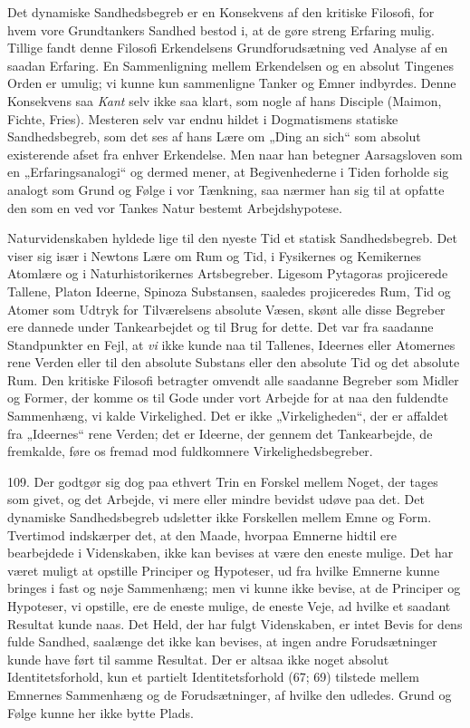 \documentclass[12pt,a4paper]{book}
\newcommand{\apage}[1]{\marginnote{\footnotesize\textit{[#1]}}}
\begin{document}
Det dynamiske Sandhedsbegreb er en Konsekvens af den kritiske Filosofi, for hvem
vore Grundtankers Sandhed bestod i, at de gøre streng Erfaring mulig. Tillige fandt
denne Filosofi Erkendelsens Grundforudsætning ved Analyse af en saadan Erfaring. En
Sammenligning mellem Erkendelsen og en absolut Tingenes Orden er umulig; vi kunne
kun sammenligne Tanker og Emner indbyrdes. Denne Konsekvens saa \emph{Kant} selv
ikke saa klart, som nogle af hans Disciple (Maimon, Fichte, Fries). Mesteren selv
var endnu hildet i Dogmatismens statiske Sandhedsbegreb, som det ses af hans Lære
om „Ding an sich“ som absolut existerende afset fra enhver Erkendelse. Men naar han
betegner Aarsagsloven som en „Erfaringsanalogi“ og dermed mener, at Begivenhederne
i Tiden forholde sig analogt som Grund og Følge i vor Tænkning, saa nærmer han sig
til at opfatte den som en ved vor Tankes Natur bestemt Arbejdshypotese.

Naturvidenskaben hyldede lige til den nyeste Tid et statisk Sandhedsbegreb. Det
viser sig især i Newtons Lære om Rum og Tid, i Fysikernes og Kemikernes Atomlære og
i Naturhistorikernes Artsbegreber. Ligesom Pytagoras projicerede Tallene, Platon
Ideerne, Spinoza Substansen, saaledes projiceredes Rum, Tid og Atomer som Udtryk
for Tilværelsens absolute Væsen, skønt alle disse Begreber ere dannede under
Tankearbejdet og til Brug for dette. Det var fra saadanne Standpunkter en Fejl, at
\emph{vi} ikke kunde naa til Tallenes, Ideernes eller Atomernes rene Verden eller
til den absolute Substans eller den absolute Tid og det absolute Rum. Den kritiske
Filosofi betragter omvendt alle saadanne Begreber som Midler og Former, der komme
os til Gode under vort Arbejde for at naa den fuldendte Sammenhæng, vi kalde
Virkelighed. Det er ikke „Virkeligheden“, der er affaldet fra \apage{261}
„Ideernes“ rene Verden; det er Ideerne, der gennem det Tankearbejde, de fremkalde,
føre os fremad mod fuldkomnere Virkelighedsbegreber.

109. Der godtgør sig dog paa ethvert Trin en Forskel mellem Noget, der tages som
givet, og det Arbejde, vi mere eller mindre bevidst udøve paa det. Det dynamiske
Sandhedsbegreb udsletter ikke Forskellen mellem Emne og Form. Tvertimod indskærper
det, at den Maade, hvorpaa Emnerne hidtil ere bearbejdede i Videnskaben, ikke kan
bevises at være den eneste mulige. Det har været muligt at opstille Principer og
Hypoteser, ud fra hvilke Emnerne kunne bringes i fast og nøje Sammenhæng; men vi
kunne ikke bevise, at de Principer og Hypoteser, vi opstille, ere de eneste mulige,
de eneste Veje, ad hvilke et saadant Resultat kunde naas. Det Held, der har fulgt
Videnskaben, er intet Bevis for dens fulde Sandhed, saalænge det ikke kan bevises,
at ingen andre Forudsætninger kunde have ført til samme Resultat. Der er altsaa
ikke noget absolut Identitetsforhold, kun et partielt Identitetsforhold (67; 69)
tilstede mellem Emnernes Sammenhæng og de Forudsætninger, af hvilke den udledes.
Grund og Følge kunne her ikke bytte Plads.
\end{document}
